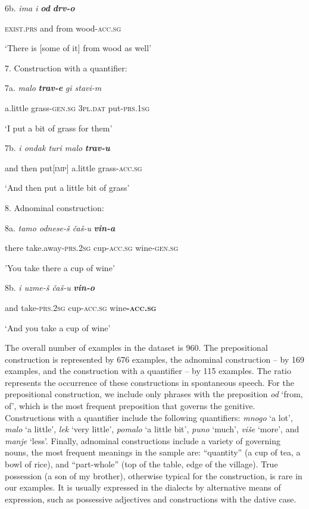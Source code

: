 \documentclass[output=paper]{langscibook}
\begin{document}
6b.   \textit{ima                        i} \textbf{\textit{od}} \textbf{\textit{drv-o}}

\textsc{exist.prs}           and     from   wood-\textsc{acc.sg}

‘There is [some of it] from wood as well’ 

7. Construction with a quantifier:

7a.   \textit{malo} \textbf{\textit{trav-e}} \textit{gi          stavi-m}

          a.little      grass\textsc{{}-gen.sg}   3\textsc{pl.dat}  put-\textsc{prs.1sg}

‘I put a bit of grass for them’

7b. \textit{i          ondak         turi                 malo} \textbf{\textit{trav-u}}

       and  then            put\textsc{[imp}]        a.little              grass-\textsc{acc.sg}

    ‘And then put a little bit of grass’  

8. Adnominal construction:

8a.        \textit{tamo         odnese-š                         čaš-u} \textbf{\textit{vin-a}}

       there        take.away-\textsc{prs.2sg}       cup-\textsc{acc.sg}       wine-\textsc{gen.sg}

       ’You take there a cup of wine\textsc{’}

8b.         \textit{i    uzme-š              čaš-u} \textbf{\textit{vin-o}}

    and  take-\textsc{prs.2sg}    cup-\textsc{acc.sg}       wine\textbf{{}-}\textbf{\textsc{acc.sg}}

   ‘And you take a cup of wine’

The overall number of examples in the dataset is 960. The prepositional construction is represented by 676 examples, the adnominal construction – by 169 examples, and the construction with a quantifier – by 115 examples. The ratio represents the occurrence of these constructions in spontaneous speech. For the prepositional construction, we include only phrases with the preposition \textit{od} ‘from, of’, which is the most frequent preposition that governs the genitive. Constructions with a quantifier include the following quantifiers: \textit{mnogo} ‘a lot’, \textit{malo} ‘a little’, \textit{lek} ‘very little’, \textit{pomalo} ‘a little bit’, \textit{puno} ‘much’, \textit{više} ‘more’, and \textit{manje} ‘less’. Finally, adnominal constructions include a variety of governing nouns, the most frequent meanings in the sample are: “quantity” (a cup of tea, a bowl of rice), and “part-whole” (top of the table, edge of the village). True possession (a son of my brother), otherwise typical for the construction, is rare in our examples. It is usually expressed in the dialects by alternative means of expression, such as possessive adjectives and constructions with the dative case.
\end{document}
